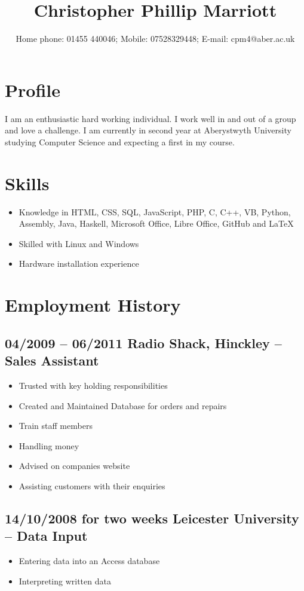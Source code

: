 \documentclass[0pt]{article}
\title{Christopher Phillip Marriott}
\date{Home phone: 01455  440046; Mobile: 07528329448; E-mail: cpm4@aber.ac.uk}
\begin{document}
\maketitle
\thispagestyle{empty}
\pagestyle{empty}

\section*{Profile}
I am an enthusiastic hard working individual. I work well in and out of a group and love a challenge. I am currently in second year at Aberystwyth University studying Computer Science and expecting a first in my course.

\section*{Skills}
\begin{itemize}
	\item Knowledge in HTML, CSS, SQL, JavaScript, PHP, C, C++, VB, Python, 	Assembly, Java, Haskell, Microsoft Office, Libre Office, GitHub and 		LaTeX 
	\item Skilled with Linux and Windows
	\item Hardware installation experience
\end{itemize}

\section*{Employment History}
\subsection*{04/2009 -- 06/2011   Radio Shack, Hinckley -- Sales Assistant}
\begin{itemize}
	\item Trusted with key holding responsibilities
	\item Created and Maintained Database for orders and repairs
	\item Train staff members
	\item Handling money
	\item Advised on companies website
	\item Assisting customers with their enquiries
\end{itemize}
	
\subsection*{14/10/2008 for two weeks     Leicester University --  Data Input}
\begin{itemize}
	\item Entering data into an Access database
	\item Interpreting written data
\end{itemize}
\end{document}
